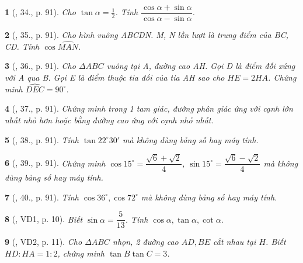 \documentclass{article}
\newtheorem{baitoan}{}
\begin{document}
\begin{baitoan}[\cite{Binh_Toan_9_tap_1}, 34., p. 91]
	Cho $\tan\alpha = \frac{1}{2}$. Tính $\dfrac{\cos\alpha + \sin\alpha}{\cos\alpha - \sin\alpha}$.
\end{baitoan}

\begin{baitoan}[\cite{Binh_Toan_9_tap_1}, 35., p. 91]
	Cho hình vuông ABCDN. M, N lần lượt là trung điểm của BC, CD. Tính $\cos\widehat{MAN}$.
\end{baitoan}

\begin{baitoan}[\cite{Binh_Toan_9_tap_1}, 36., p. 91]
	Cho $\Delta ABC$ vuông tại A, đường cao AH. Gọi D là điểm đối xứng với A qua B. Gọi E là điểm thuộc tia đối của tia AH sao cho $HE = 2HA$. Chứng minh $\widehat{DEC} = 90^\circ$.
\end{baitoan}

\begin{baitoan}[\cite{Binh_Toan_9_tap_1}, 37., p. 91]
	Chứng minh trong 1 tam giác, đường phân giác ứng với cạnh lớn nhất nhỏ hơn hoặc bằng đường cao ứng với cạnh nhỏ nhất.
\end{baitoan}

\begin{baitoan}[\cite{Binh_Toan_9_tap_1}, 38., p. 91]
	Tính $\tan22^\circ30'$ mà không dùng bảng số hay máy tính.
\end{baitoan}

\begin{baitoan}[\cite{Binh_Toan_9_tap_1}, 39., p. 91]
	Chứng minh $\cos15^\circ = \dfrac{\sqrt{6} + \sqrt{2}}{4}$, $\sin15^\circ = \dfrac{\sqrt{6} - \sqrt{2}}{4}$ mà không dùng bảng số hay máy tính.
\end{baitoan}

\begin{baitoan}[\cite{Binh_Toan_9_tap_1}, 40., p. 91]
	Tính $\cos36^\circ,\cos72^\circ$ mà không dùng bảng số hay máy tính.
\end{baitoan}

\begin{baitoan}[\cite{TLCT_THCS_Toan_9_hinh_hoc}, VD1, p. 10]
	Biết $\sin\alpha = \dfrac{5}{13}$. Tính $\cos\alpha,\tan\alpha,\cot\alpha$.
\end{baitoan}

\begin{baitoan}[\cite{TLCT_THCS_Toan_9_hinh_hoc}, VD2, p. 11]
	Cho $\Delta ABC$ nhọn, 2 đường cao $AD,BE$ cắt nhau tại $H$. Biết $HD:HA = 1:2$, chứng minh $\tan B\tan C = 3$.
\end{baitoan}
\end{document}
